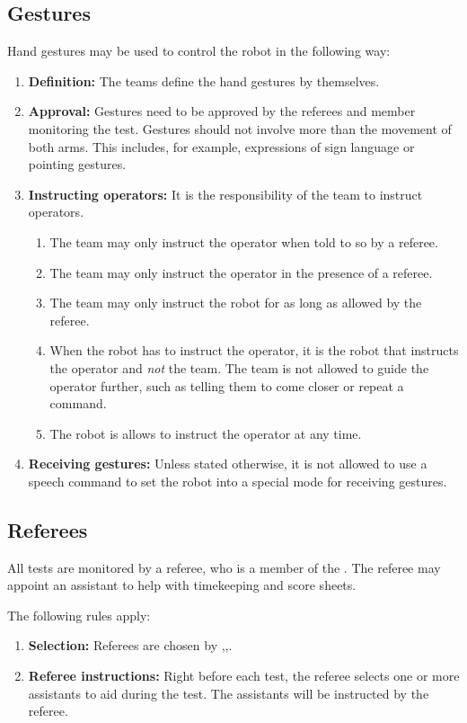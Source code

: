 \subsection{Gestures}\label{rule:gestures}
Hand gestures may be used to control the robot in the following way:
\begin{enumerate}
	\item \textbf{Definition:} The teams define the hand gestures by themselves.

	\item \textbf{Approval:} Gestures need to be approved by the referees and \TC{} member monitoring the test. Gestures should not involve more than the movement of both arms. This includes, for example, expressions of sign language or pointing gestures.

	\item \textbf{Instructing operators:} It is the responsibility of the team to instruct operators.
	\begin{enumerate}
		\item The team may only instruct the operator when told to so by a referee.
		\item The team may only instruct the operator in the presence of a referee.
		\item The team may only instruct the robot for as long as allowed by the referee.
		\item When the robot has to instruct the operator, it is the robot that instructs the operator and \emph{not} the team. The team is not allowed to guide the operator further, such as telling them to come closer or repeat a command.
		\item The robot is allows to instruct the operator at any time.
	\end{enumerate}

	\item \textbf{Receiving gestures:} Unless stated otherwise, it is not allowed to use a speech command to set the robot into a special mode for receiving gestures.
\end{enumerate}



\subsection{Referees}\label{rule:referees}
All tests are monitored by a referee, who is a member of the \TC{}. The referee may appoint an assistant to help with timekeeping and score sheets.

The following rules apply:
\begin{enumerate}
	\item \textbf{Selection:} Referees are chosen by \EC{},\TC{},\OC{}.

	\item \textbf{Referee instructions:} Right before each test, the referee selects one or more assistants to aid during the test. The assistants will be instructed by the referee.
\end{enumerate}


